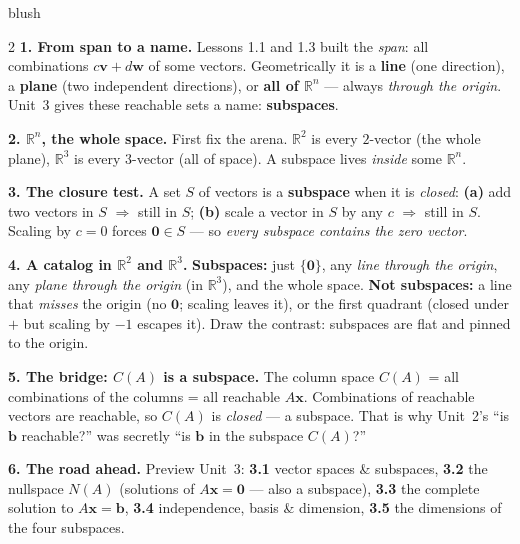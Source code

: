 \documentclass[10pt]{article}
\newcommand{\vv}{\mathbf{v}}
\newcommand{\ww}{\mathbf{w}}
\newcommand{\zero}{\mathbf{0}}
\begin{document}
\begin{skillbox}[Lesson]{blush}
\begin{multicols}{2}
\textbf{1. From span to a name.} Lessons 1.1 and 1.3 built the \emph{span}: all combinations
$c\vv+d\ww$ of some vectors. Geometrically it is a \textbf{line} (one direction), a
\textbf{plane} (two independent directions), or \textbf{all of $\mathbb{R}^n$} --- always
\emph{through the origin}. Unit~3 gives these reachable sets a name: \textbf{subspaces}.

\textbf{2. $\mathbb{R}^n$, the whole space.} First fix the arena. $\mathbb{R}^2$ is every
$2$-vector (the whole plane), $\mathbb{R}^3$ is every $3$-vector (all of space). A subspace lives
\emph{inside} some $\mathbb{R}^n$.

\textbf{3. The closure test.} A set $S$ of vectors is a \textbf{subspace} when it is
\emph{closed}: \textbf{(a)} add two vectors in $S$ $\Rightarrow$ still in $S$; \textbf{(b)} scale
a vector in $S$ by any $c$ $\Rightarrow$ still in $S$. Scaling by $c=0$ forces $\zero\in S$ --- so
\emph{every subspace contains the zero vector}.

\columnbreak

\textbf{4. A catalog in $\mathbb{R}^2$ and $\mathbb{R}^3$.} \textbf{Subspaces:} just $\{\zero\}$,
any \emph{line through the origin}, any \emph{plane through the origin} (in $\mathbb{R}^3$), and
the whole space. \textbf{Not subspaces:} a line that \emph{misses} the origin (no $\zero$; scaling
leaves it), or the first quadrant (closed under $+$ but scaling by $-1$ escapes it). Draw the
contrast: subspaces are flat and pinned to the origin.

\textbf{5. The bridge: $C(A)$ is a subspace.} The column space $C(A)$ = all combinations of the
columns = all reachable $A\mathbf x$. Combinations of reachable vectors are reachable, so $C(A)$
is \emph{closed} --- a subspace. That is why Unit~2's ``is $\mathbf b$ reachable?'' was secretly
``is $\mathbf b$ in the subspace $C(A)$?''

\textbf{6. The road ahead.} Preview Unit~3: \textbf{3.1} vector spaces \& subspaces, \textbf{3.2}
the nullspace $N(A)$ (solutions of $A\mathbf x=\zero$ --- also a subspace), \textbf{3.3} the
complete solution to $A\mathbf x=\mathbf b$, \textbf{3.4} independence, basis \& dimension,
\textbf{3.5} the dimensions of the four subspaces.
\end{multicols}
\end{skillbox}
\end{document}
